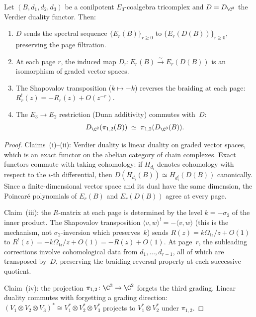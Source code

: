 \begin{theorem}
\label{thm:verdier-spectral-functor}
Let $(B, d_1, d_2, d_3)$ be a conilpotent $E_3$-coalgebra tricomplex and
$D = D_{\C^3}$ the Verdier duality functor. Then:
\begin{enumerate}[label=\textup{(\roman*)}]
 \item $D$ sends the spectral sequence $\{E_r(B)\}_{r \geq 0}$ to
 $\{E_r(D(B))\}_{r \geq 0}$, preserving the page filtration.
 \item At each page $r$, the induced map
 $D_r \colon E_r(B) \xrightarrow{\sim} E_r(D(B))$
 is an isomorphism of graded vector spaces.
 \item The Shapovalov transposition ($k \mapsto -k$) reverses the braiding
 at each page: $R_r^!(z) = -R_r(z) + O(z^{-r})$.
 \item The $E_3 \to E_2$ restriction (Dunn additivity) commutes with~$D$:
 \[
 D_{\C^2}(\pi_{1,2}(B)) \;\simeq\; \pi_{1,2}(D_{\C^3}(B)).
 \]
\end{enumerate}
\end{theorem}

\begin{proof}
Claims~(i)--(ii): Verdier duality is linear duality on graded vector spaces,
which is an exact functor on the abelian category of chain complexes. Exact
functors commute with taking cohomology: if $H_{d_i}$ denotes cohomology with
respect to the $i$-th differential, then $D(H_{d_i}(B)) \simeq H_{d_i^!}(D(B))$
canonically. Since a finite-dimensional vector space and its dual have the
same dimension, the Poincar\'{e} polynomials of $E_r(B)$ and $E_r(D(B))$ agree
at every page.

Claim~(iii): the $R$-matrix at each page is determined by the level
$k = -\sigma_2$ of the inner product. The Shapovalov transposition
$\langle v, w \rangle^! = -\langle v, w \rangle$ (this is the mechanism,
not $\sigma_2$-inversion which preserves~$k$)
sends $R(z) = k\Omega_{\mathrm{tr}}/z + O(1)$ to $R^!(z) = -k\Omega_{\mathrm{tr}}/z + O(1) = -R(z) + O(1)$.
At page~$r$, the subleading corrections involve cohomological data from
$d_1, \ldots, d_{r-1}$, all of which are transposed by~$D$, preserving the
braiding-reversal property at each successive quotient.

Claim~(iv): the projection $\pi_{1,2} \colon \C^3 \to \C^2$ forgets the
third grading. Linear duality commutes with forgetting a grading direction:
$(V_1 \otimes V_2 \otimes V_3)^* \cong V_1^* \otimes V_2^* \otimes V_3^*$
projects to $V_1^* \otimes V_2^*$ under $\pi_{1,2}$.

\end{proof}

